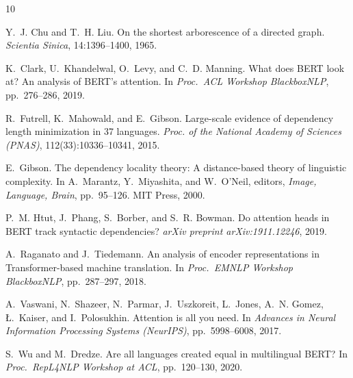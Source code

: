 \documentclass[11pt, a4paper]{article}
\begin{document}
\newpage

\begin{thebibliography}{10}

Y.~J. Chu and T.~H. Liu.
\newblock On the shortest arborescence of a directed graph.
\newblock \emph{Scientia Sinica}, 14:1396--1400, 1965.

K.~Clark, U.~Khandelwal, O.~Levy, and C.~D. Manning.
\newblock What does {BERT} look at? {A}n analysis of {BERT}'s attention.
\newblock In \emph{Proc.\ ACL Workshop BlackboxNLP}, pp.\ 276--286, 2019.

R.~Futrell, K.~Mahowald, and E.~Gibson.
\newblock Large-scale evidence of dependency length minimization in 37 languages.
\newblock \emph{Proc. of the National Academy of Sciences (PNAS)}, 112(33):10336--10341, 2015.

E.~Gibson.
\newblock The dependency locality theory: A distance-based theory of linguistic complexity.
\newblock In A.~Marantz, Y.~Miyashita, and W.~O'Neil, editors, \emph{Image, Language, Brain}, pp.\ 95--126. MIT Press, 2000.

P.~M. Htut, J.~Phang, S.~Borber, and S.~R. Bowman.
\newblock Do attention heads in {BERT} track syntactic dependencies?
\newblock \emph{arXiv preprint arXiv:1911.12246}, 2019.

A.~Raganato and J.~Tiedemann.
\newblock An analysis of encoder representations in {T}ransformer-based machine translation.
\newblock In \emph{Proc.\ EMNLP Workshop BlackboxNLP}, pp.\ 287--297, 2018.

A.~Vaswani, N.~Shazeer, N.~Parmar, J.~Uszkoreit, L.~Jones, A.~N. Gomez, \L.~Kaiser, and I.~Polosukhin.
\newblock Attention is all you need.
\newblock In \emph{Advances in Neural Information Processing Systems (NeurIPS)}, pp.\ 5998--6008, 2017.

S.~Wu and M.~Dredze.
\newblock Are all languages created equal in multilingual {BERT}?
\newblock In \emph{Proc.\ RepL4NLP Workshop at ACL}, pp.\ 120--130, 2020.

\end{thebibliography}
\end{document}
